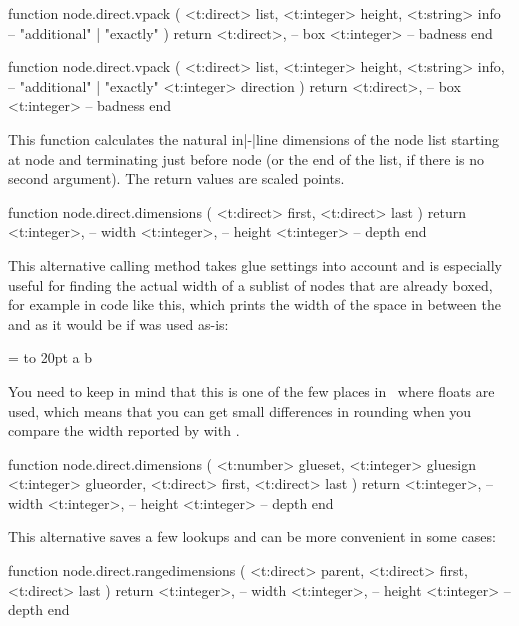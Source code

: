function node.direct.vpack (
    <t:direct>  list,
    <t:integer> height,
    <t:string>  info -- "additional" | "exactly"
)
    return
        <t:direct>, -- box
        <t:integer> -- badness
end

function node.direct.vpack (
    <t:direct>  list,
    <t:integer> height,
    <t:string>  info, -- "additional" | "exactly"
    <t:integer> direction
)
    return
        <t:direct>, -- box
        <t:integer> -- badness
end
\stoptyping

This function calculates the natural in|-|line dimensions of the node list starting
at node  and terminating just before node  (or the end of the
list, if there is no second argument). The return values are scaled points.

\starttyping[option=LUA]
function node.direct.dimensions (
    <t:direct> first,
    <t:direct> last
)
    return
        <t:integer>, -- width
        <t:integer>, -- height
        <t:integer>  -- depth
end
\stoptyping

This alternative calling method takes glue settings into account and is especially useful for
finding the actual width of a sublist of nodes that are already boxed, for
example in code like this, which prints the width of the space in between the
 and  as it would be if  was used as-is:

\starttyping
{} = \hbox to 20pt {a b}

\stoptyping

You need to keep in mind that this is one of the few places in \TEX\ where floats
are used, which means that you can get small differences in rounding when you
compare the width reported by  with .

\starttyping[option=LUA]
function node.direct.dimensions (
    <t:number>  glueset,
    <t:integer> gluesign
    <t:integer> glueorder,
    <t:direct>  first,
    <t:direct>  last
)
    return
        <t:integer>, -- width
        <t:integer>, -- height
        <t:integer>  -- depth
end
\stoptyping

This alternative saves a few lookups and can be more convenient in some
cases:

\starttyping[option=LUA]
function node.direct.rangedimensions (
    <t:direct> parent,
    <t:direct> first,
    <t:direct> last
)
    return
        <t:integer>, -- width
        <t:integer>, -- height
        <t:integer>  -- depth
end
\stoptyping

